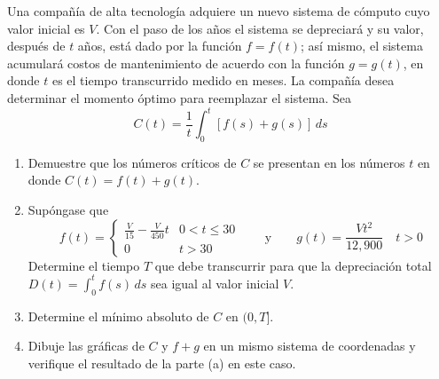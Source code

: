 \item Una compañía de alta tecnología adquiere un nuevo sistema de cómputo cuyo valor inicial es $V$. Con el paso de los años el sistema se depreciará y su valor, después de $t$ años, está dado por la función $f = f(t)$; así mismo, el sistema acumulará costos de mantenimiento de acuerdo con la función $g = g(t)$, en donde $t$ es el tiempo transcurrido medido en meses. La compañía desea determinar el momento óptimo para reemplazar el sistema. Sea
$$C(t) = \frac{1}{t} \int_0^t [f(s) + g(s)] \, ds$$
\begin{enumerate}
    \item[(a)] Demuestre que los números críticos de $C$ se presentan en los números $t$ en donde $C(t) = f(t) + g(t)$.
    \item[(b)] Supóngase que
    $$f(t) = \begin{cases} \frac{V}{15} - \frac{V}{450}t & 0 < t \le 30 \\ 0 & t > 30 \end{cases} \qquad \text{y} \qquad g(t) = \frac{Vt^2}{12,900} \quad t > 0$$
    Determine el tiempo $T$ que debe transcurrir para que la depreciación total $D(t) = \int_0^t f(s) \, ds$ sea igual al valor inicial $V$.
    \item[(c)] Determine el mínimo absoluto de $C$ en $(0, T]$.
    \item[(d)] Dibuje las gráficas de $C$ y $f + g$ en un mismo sistema de coordenadas y verifique el resultado de la parte (a) en este caso.
\end{enumerate}
